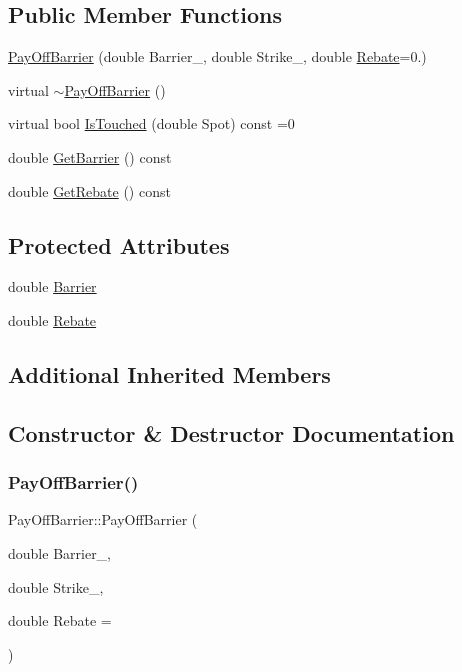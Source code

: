 \subsection*{Public Member Functions}
\begin{DoxyCompactItemize}
\item 
\hyperlink{classPayOffBarrier_af1530a3c7badd16d31c52fd2b74c9d97}{Pay\+Off\+Barrier} (double Barrier\+\_\+, double Strike\+\_\+, double \hyperlink{classPayOffBarrier_aca3ea631dcdb28a1df971b74774e41f8}{Rebate}=0.)
\item 
virtual \hyperlink{classPayOffBarrier_a16fa76cfd65461bc2eea467ccbdb23eb}{$\sim$\+Pay\+Off\+Barrier} ()
\item 
virtual bool \hyperlink{classPayOffBarrier_a2aa9162c618c4f72a6593dc625e1e1e8}{Is\+Touched} (double Spot) const =0
\item 
double \hyperlink{classPayOffBarrier_a60eb2ac1bebf772f3acd9cb83ae8fe27}{Get\+Barrier} () const
\item 
double \hyperlink{classPayOffBarrier_ab8e43255a688a822dc651f0b47000fdc}{Get\+Rebate} () const
\end{DoxyCompactItemize}
\subsection*{Protected Attributes}
\begin{DoxyCompactItemize}
\item 
double \hyperlink{classPayOffBarrier_a0f514158e3a0ba82736c3566b53ccfc9}{Barrier}
\item 
double \hyperlink{classPayOffBarrier_aca3ea631dcdb28a1df971b74774e41f8}{Rebate}
\end{DoxyCompactItemize}
\subsection*{Additional Inherited Members}


\subsection{Constructor \& Destructor Documentation}
\hypertarget{classPayOffBarrier_af1530a3c7badd16d31c52fd2b74c9d97}{}\label{classPayOffBarrier_af1530a3c7badd16d31c52fd2b74c9d97} 
\subsubsection{\texorpdfstring{Pay\+Off\+Barrier()}{PayOffBarrier()}}
{\footnotesize\ttfamily Pay\+Off\+Barrier\+::\+Pay\+Off\+Barrier (\begin{DoxyParamCaption}\item[{double}]{Barrier\+\_\+,  }\item[{double}]{Strike\+\_\+,  }\item[{double}]{Rebate = {} }\end{DoxyParamCaption})}

